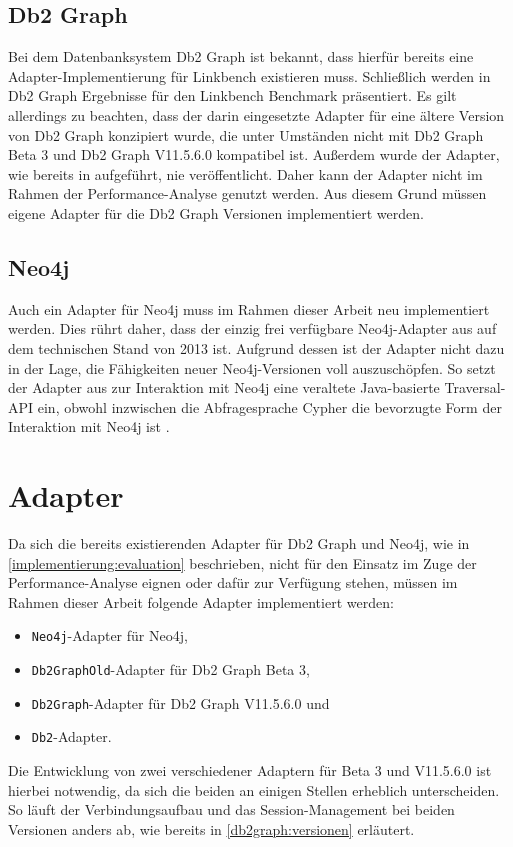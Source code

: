 \subsection{Db2 Graph}
\label{implementierung:evaluation:db2graph}
Bei dem Datenbanksystem Db2 Graph ist bekannt, dass hierfür bereits eine Adapter-Implementierung für Linkbench existieren muss. Schließlich werden in \cite{sigmod_tian} Db2 Graph Ergebnisse für den Linkbench Benchmark präsentiert. Es gilt allerdings zu beachten, dass der darin eingesetzte Adapter für eine ältere Version von Db2 Graph konzipiert wurde, die unter Umständen nicht mit Db2 Graph Beta 3 und Db2 Graph V11.5.6.0 kompatibel ist. Außerdem wurde der Adapter, wie bereits in  aufgeführt, nie veröffentlicht. Daher kann der Adapter nicht im Rahmen der Performance-Analyse genutzt werden. Aus diesem Grund müssen eigene Adapter für die Db2 Graph Versionen implementiert werden. 

\subsection{Neo4j}
\label{implementierung:evaluation:neo4j}
Auch ein Adapter für Neo4j muss im Rahmen dieser Arbeit neu implementiert werden. Dies rührt daher, dass der einzig frei verfügbare Neo4j-Adapter aus \cite{neo_linkbench_github} auf dem technischen Stand von 2013 ist. Aufgrund dessen ist der Adapter nicht dazu in der Lage, die Fähigkeiten neuer Neo4j-Versionen voll auszuschöpfen. So setzt der Adapter aus \cite{neo_linkbench_github} zur Interaktion mit Neo4j eine veraltete Java-basierte Traversal-API ein, obwohl inzwischen die Abfragesprache Cypher die bevorzugte Form der Interaktion mit Neo4j ist \cite{gdbms}.

\section{Adapter}
\label{implementierung:adapter}
Da sich die bereits existierenden Adapter für Db2 Graph und Neo4j, wie in \autoref{implementierung:evaluation} beschrieben, nicht für den Einsatz im Zuge der Performance-Analyse eignen oder dafür zur Verfügung stehen, müssen im Rahmen dieser Arbeit folgende Adapter implementiert werden:
\begin{itemize}
    \item \texttt{Neo4j}-Adapter für Neo4j,
    \item \texttt{Db2GraphOld}-Adapter für Db2 Graph Beta 3, 
    \item \texttt{Db2Graph}-Adapter für Db2 Graph V11.5.6.0 und
    \item \texttt{Db2}-Adapter.
\end{itemize}
Die Entwicklung von zwei verschiedener Adaptern für Beta 3 und V11.5.6.0 ist hierbei notwendig, da sich die beiden an einigen Stellen erheblich unterscheiden. So läuft der Verbindungsaufbau und das Session-Management bei beiden Versionen anders ab, wie bereits in \autoref{db2graph:versionen} erläutert. 

